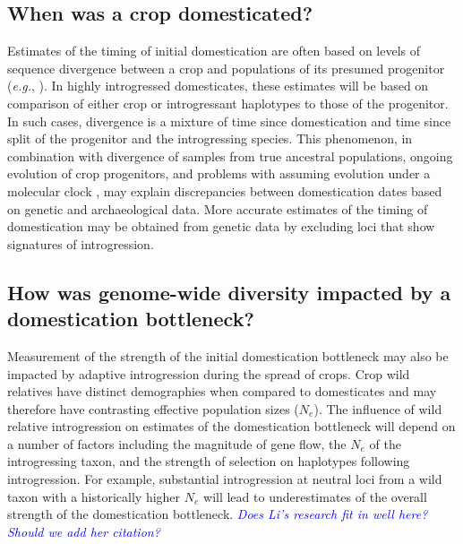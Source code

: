 \documentclass[11pt]{article}
\newcommand{\gmj}[1]{\textcolor{blue}{ \emph{\scriptsize  #1}} } %
\begin{document}
\subsection*{When was a crop domesticated?}
Estimates of the timing of initial domestication are often based on levels of sequence divergence between a crop and populations of its presumed progenitor (\emph{e.g.}, \cite{matsuoka2002single, molina2011molecular}).
In highly introgressed domesticates, these estimates will be based on comparison of either crop or introgressant haplotypes to those of the progenitor.
In such cases, divergence is a mixture of time since domestication and time since split of the progenitor and the introgressing species.
This phenomenon, in combination with divergence of samples from true ancestral populations, ongoing evolution of crop progenitors, and problems with assuming evolution under a molecular clock \cite{Zeder2006}, may explain discrepancies between domestication dates based on genetic and archaeological data.
More accurate estimates of the timing of domestication may be obtained from genetic data by excluding loci that show signatures of introgression.

\subsection*{How was genome-wide diversity impacted by a domestication bottleneck?}
Measurement of the strength of the initial domestication bottleneck may also be impacted by adaptive introgression during the spread of crops.
Crop wild relatives have distinct demographies when compared to domesticates and may therefore have contrasting effective population sizes ($N_e$).
The influence of wild relative introgression on estimates of the domestication bottleneck will depend on a number of factors including the magnitude of gene flow, the $N_e$ of the introgressing taxon, and the strength of selection on haplotypes following introgression.
For example, substantial introgression at neutral loci from a wild taxon with a historically higher $N_e$ will lead to underestimates of the overall strength of the domestication bottleneck.
\gmj{Does Li's research fit in well here? Should we add her citation?}
\end{document}
